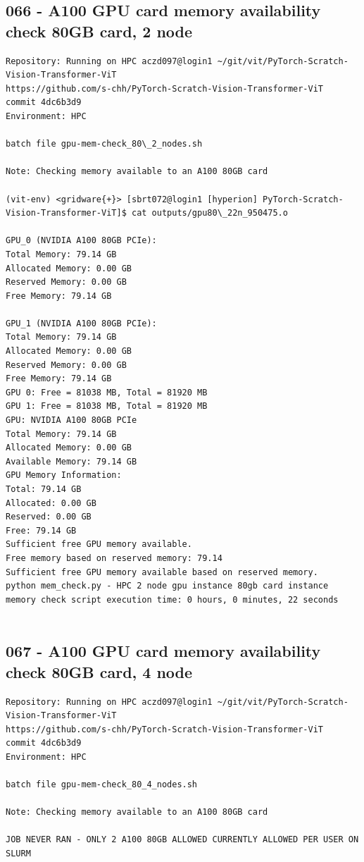 \subsection{066 - A100 GPU card memory availability check 80GB card, 2 node}
\label{app_res:066}
\begin{verbatim}
Repository: Running on HPC aczd097@login1 ~/git/vit/PyTorch-Scratch-Vision-Transformer-ViT
https://github.com/s-chh/PyTorch-Scratch-Vision-Transformer-ViT
commit 4dc6b3d9
Environment: HPC

batch file gpu-mem-check_80\_2_nodes.sh

Note: Checking memory available to an A100 80GB card 

(vit-env) <gridware{+}> [sbrt072@login1 [hyperion] PyTorch-Scratch-Vision-Transformer-ViT]$ cat outputs/gpu80\_22n_950475.o

GPU_0 (NVIDIA A100 80GB PCIe):
Total Memory: 79.14 GB
Allocated Memory: 0.00 GB
Reserved Memory: 0.00 GB
Free Memory: 79.14 GB

GPU_1 (NVIDIA A100 80GB PCIe):
Total Memory: 79.14 GB
Allocated Memory: 0.00 GB
Reserved Memory: 0.00 GB
Free Memory: 79.14 GB
GPU 0: Free = 81038 MB, Total = 81920 MB
GPU 1: Free = 81038 MB, Total = 81920 MB
GPU: NVIDIA A100 80GB PCIe
Total Memory: 79.14 GB
Allocated Memory: 0.00 GB
Available Memory: 79.14 GB
GPU Memory Information:
Total: 79.14 GB
Allocated: 0.00 GB
Reserved: 0.00 GB
Free: 79.14 GB
Sufficient free GPU memory available.
Free memory based on reserved memory: 79.14
Sufficient free GPU memory available based on reserved memory.
python mem_check.py - HPC 2 node gpu instance 80gb card instance memory check script execution time: 0 hours, 0 minutes, 22 seconds
            
\end{verbatim}

\subsection{067 - A100 GPU card memory availability check 80GB card, 4 node}
\label{app_res:067}
\begin{verbatim}
Repository: Running on HPC aczd097@login1 ~/git/vit/PyTorch-Scratch-Vision-Transformer-ViT
https://github.com/s-chh/PyTorch-Scratch-Vision-Transformer-ViT
commit 4dc6b3d9
Environment: HPC

batch file gpu-mem-check_80_4_nodes.sh

Note: Checking memory available to an A100 80GB card 

JOB NEVER RAN - ONLY 2 A100 80GB ALLOWED CURRENTLY ALLOWED PER USER ON SLURM
          
\end{verbatim}

